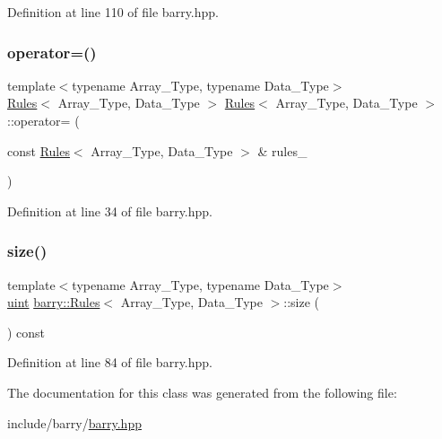 Definition at line 110 of file barry.\+hpp.

\mbox{\label{classbarry_1_1_rules_ab87544febb8301772164570708bd708e}} 
\subsubsection{\texorpdfstring{operator=()}{operator=()}}
{\footnotesize\ttfamily template$<$typename Array\+\_\+\+Type, typename Data\+\_\+\+Type$>$ \\
\hyperlink{classbarry_1_1_rules}{Rules}$<$ Array\+\_\+\+Type, Data\+\_\+\+Type $>$ \hyperlink{classbarry_1_1_rules}{Rules}$<$ Array\+\_\+\+Type, Data\+\_\+\+Type $>$\+::operator= (\begin{DoxyParamCaption}\item[{const \hyperlink{classbarry_1_1_rules}{Rules}$<$ Array\+\_\+\+Type, Data\+\_\+\+Type $>$ \&}]{rules\+\_\+ }\end{DoxyParamCaption})}



Definition at line 34 of file barry.\+hpp.

\mbox{\label{classbarry_1_1_rules_a590fd2603dd686e91e33330529ab8e77}} 
\subsubsection{\texorpdfstring{size()}{size()}}
{\footnotesize\ttfamily template$<$typename Array\+\_\+\+Type, typename Data\+\_\+\+Type$>$ \\
\hyperlink{namespacebarry_a11dfc53ddb4672278319aa04f1e09a6c}{uint} \hyperlink{classbarry_1_1_rules}{barry\+::\+Rules}$<$ Array\+\_\+\+Type, Data\+\_\+\+Type $>$\+::size (\begin{DoxyParamCaption}{ }\end{DoxyParamCaption}) const\hspace{0.3cm}{\ttfamily [inline]}}



Definition at line 84 of file barry.\+hpp.



The documentation for this class was generated from the following file\+:\begin{DoxyCompactItemize}
\item 
include/barry/\hyperlink{barry_8hpp}{barry.\+hpp}\end{DoxyCompactItemize}
